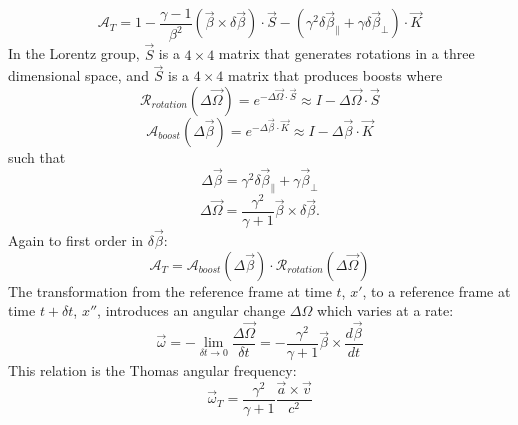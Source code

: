 \documentclass{outhesis}
\begin{document}
\[
\mathcal{A}_T = 1- \frac{\gamma - 1}{\beta^2}\left(\overrightarrow{\beta}\times \delta \overrightarrow{\beta}\right)\cdot \overrightarrow{S} - \left(\gamma^2 \delta \overrightarrow{\beta}_{\parallel}
+ \gamma \delta \overrightarrow{\beta}_{\perp}   \right)\cdot \overrightarrow{K}
\]
In the Lorentz group, $\overrightarrow{S}$ is a $4\times 4$ matrix that generates rotations in a three dimensional space, and $\overrightarrow{S}$ is a $4\times 4$ matrix that produces boosts where
\[
\mathcal{R}_{rotation}\left(\Delta \overrightarrow{\Omega} \right) = e^{-\Delta \overrightarrow{\Omega} \cdot \overrightarrow{S}} \approx I - \Delta \overrightarrow{\Omega} \cdot \overrightarrow{S}
\]
\[
\mathcal{A}_{boost}\left(\Delta \overrightarrow{\beta} \right) = e^{-\Delta \overrightarrow{\beta} \cdot \overrightarrow{K}} \approx I - \Delta \overrightarrow{\beta} \cdot \overrightarrow{K}
\]
such that 
\[
\Delta \overrightarrow{\beta} = \gamma^2 \delta \overrightarrow{\beta}_{\parallel} + \gamma \overrightarrow{\beta}_{\perp} 
\]
\[
\Delta \overrightarrow{\Omega} =\frac{\gamma^2}{\gamma + 1} \overrightarrow{\beta} \times \delta\overrightarrow{\beta}.
\]
Again to first order in $\delta\overrightarrow{\beta}$: 
\[
\mathcal{A}_T = \mathcal{A}_{boost}\left(\Delta \overrightarrow{\beta} \right) \cdot \mathcal{R}_{rotation}\left(\Delta \overrightarrow{\Omega} \right)
\]
The transformation from the reference frame at time $t$, $x'$, to a reference frame at time $t+\delta t$, $x''$, introduces an angular change $\Delta \Omega$ which varies at a rate:
\[
\overrightarrow{\omega} = - \lim_{\delta t \to 0} \frac{\Delta \overrightarrow{\Omega}}{\delta t} = -\frac{\gamma^2}{\gamma + 1} \overrightarrow{\beta} \times \frac{d\overrightarrow{\beta}}{dt}
\] 
This relation is the Thomas angular frequency:
\begin{equation}
\label{eq:wt}
\overrightarrow{\omega}_T = \frac{\gamma^2}{\gamma + 1} \frac{\overrightarrow{a}\times \overrightarrow{v}}{c^2}
\end{equation}
\end{document}
